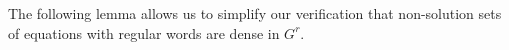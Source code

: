 \documentclass{article}
\theoremstyle{remark}
\theoremstyle{definition}
\begin{document}
{%







{The following lemma allows us to simplify our verification that non-solution sets of equations with regular words are dense in $G^r$.}

}
\end{document}
